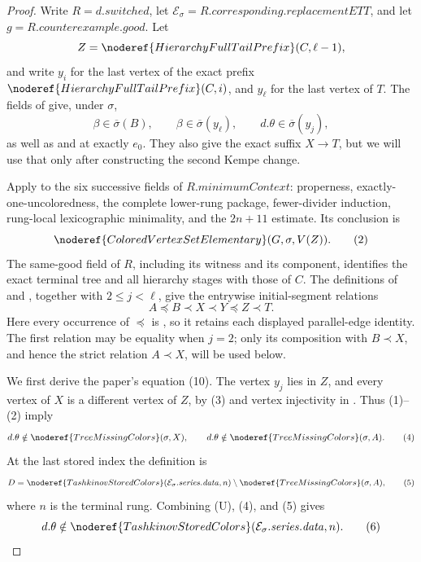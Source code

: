 \begin{proof}
Write $R=d.\mathit{switched}$, let
$\mathcal E_\sigma=R.\mathit{corresponding.replacementETT}$, and let
$g=R.\mathit{counterexample.good}$.  Let
\[
 Z=\noderef{HierarchyFullTailPrefix}(C,\ell-1),
\]
and write $y_i$ for the last vertex of the exact prefix
$\noderef{HierarchyFullTailPrefix}(C,i)$, and $y_\ell$ for the last
vertex of $T$.  The fields of
 give, under $\sigma$,
\[
 \beta\in\overline\sigma(B),\qquad
 \beta\in\overline\sigma(y_\ell),\qquad
 d.\theta\in\overline\sigma(y_j),                             \tag{1}
\]
as well as  and
 at exactly $e_0$.  They also give the exact
 suffix $X\to T$,
but we will use that only after constructing the second Kempe change.

Apply  to the six
successive fields of $R.\mathit{minimumContext}$: properness,
exactly-one-uncoloredness, the complete lower-rung package,
fewer-divider induction, rung-local lexicographic minimality, and the
$2n+11$ estimate.  Its conclusion is
\[
 \noderef{ColoredVertexSetElementary}(G,\sigma,V(Z)).          \tag{2}
\]
The same-good field of $R$, including its 
witness and its
 component, identifies the exact terminal
tree and all hierarchy stages with those of $C$.  The definitions of
 and
, together with $2\le j<\ell$, give
the entrywise initial-segment relations
\[
          A\preccurlyeq B\prec X\prec Y\preccurlyeq Z\prec T. \tag{3}
\]
Here every occurrence of $\preccurlyeq$ is
, so it retains each displayed
parallel-edge identity.  The first relation may be equality when $j=2$;
only its composition with $B\prec X$, and hence the strict relation
$A\prec X$, will be used below.

We first derive the paper's equation (10).  The vertex $y_j$ lies in
$Z$, and every vertex of $X$ is a different vertex of $Z$, by (3)
and vertex injectivity in .  Thus (1)--(2) imply
\[
 d.\theta\notin\noderef{TreeMissingColors}(\sigma,X),
 \qquad
 d.\theta\notin\noderef{TreeMissingColors}(\sigma,A).          \tag{4}
\]
At the last stored index the definition
 is
\[
 D=\noderef{TashkinovStoredColors}
      (\mathcal E_\sigma.\mathit{series.data},n)
       \setminus\noderef{TreeMissingColors}(\sigma,A),         \tag{5}
\]
where $n$ is the terminal rung.  Combining (U), (4), and (5) gives
\[
 d.\theta\notin
 \noderef{TashkinovStoredColors}
      (\mathcal E_\sigma.\mathit{series.data},n).              \tag{6}
\]


\end{proof}
